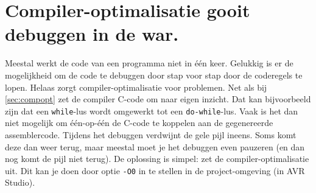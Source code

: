 \documentclass[12pt,a4paper,final,oneside,fleqn]{article}
\begin{document}
\section{Compiler-optimalisatie gooit debuggen in de war.}
Meestal werkt de code van een programma niet in \'{e}\'{e}n keer. Gelukkig is
er de mogelijkheid om de code te debuggen door stap voor stap door de coderegels
te lopen. Helaas zorgt compiler-optimalisatie voor problemen. Net als
bij \ref{sec:compopt} zet de compiler C-code om naar eigen inzicht. Dat
kan bijvoorbeeld zijn dat een \texttt{while}-lus wordt omgewerkt tot een
\texttt{do-while}-lus. Vaak is het dan niet mogelijk om \'{e}\'{e}n-op-\'{e}\'{e}n
de C-code te koppelen aan de gegenereerde assemblercode. Tijdens het debuggen
verdwijnt de gele pijl ineens. Soms komt deze dan weer terug, maar meestal moet
je het debuggen even pauzeren (en dan nog komt de pijl niet terug). De oplossing
is simpel: zet de compiler-optimalisatie uit. Dit kan je doen door optie
\texttt{-O0} in te stellen in de project-omgeving (in AVR Studio).



 
\printindex
\end{document}
